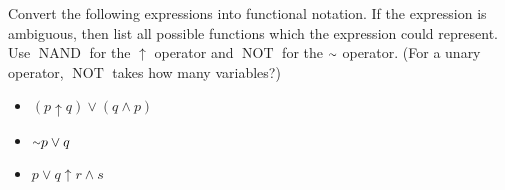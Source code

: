 Convert the following expressions into functional notation. If the expression is ambiguous, then list all possible functions which the expression could represent. Use $\operatorname{NAND}$ for the $\uparrow$ operator and $\operatorname{NOT}$ for the $\shortsim$ operator. (For a unary operator, $\operatorname{NOT}$ takes how many variables?)

\begin{itemize}
	\item $(p \uparrow q) \lor (q \land p)$
	\item $\shortsim p \lor q$
	\item $p \lor q \uparrow r \land s$
\end{itemize}